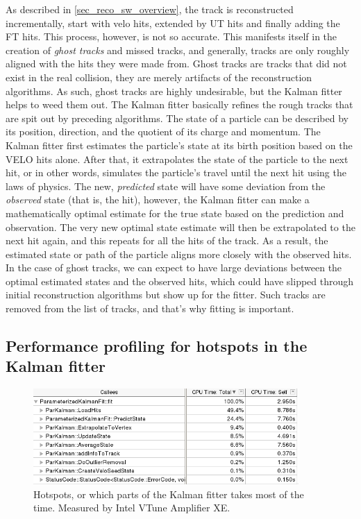 \documentclass[12pt]{article}
\begin{document}
As described in \ref{sec_reco_sw_overview}, the track is reconstructed incrementally, start with velo hits, extended by UT hits and finally adding the FT hits. This process, however, is not so accurate. This manifests itself in the creation of \textit{ghost tracks} and missed tracks, and generally, tracks are only roughly aligned with the hits they were made from. Ghost tracks are tracks that did not exist in the real collision, they are merely artifacts of the reconstruction algorithms. As such, ghost tracks are highly undesirable, but the Kalman fitter helps to weed them out. 
The Kalman fitter basically refines the rough tracks that are spit out by preceding algorithms. The state of a particle can be described by its position, direction, and the quotient of its charge and momentum. The Kalman fitter first estimates the particle's state at its birth position based on the VELO hits alone. After that, it extrapolates the state of the particle to the next hit, or in other words, simulates the particle's travel until the next hit using the laws of physics. The new, \textit{predicted} state will have some deviation from the \textit{observed} state (that is, the hit), however, the Kalman fitter can make a mathematically optimal estimate for the true state based on the prediction and observation. The very new optimal state estimate will then be extrapolated to the next hit again, and this repeats for all the hits of the track.
As a result, the estimated state or path of the particle aligns more closely with the observed hits. In the case of ghost tracks, we can expect to have large deviations between the optimal estimated states and the observed hits, which could have slipped through initial reconstruction algorithms but show up for the fitter. Such tracks are removed from the list of tracks, and that's why fitting is important.


\subsection{Performance profiling for hotspots in the Kalman fitter}

\begin{figure}[H]
	\begin{center}
		\includegraphics[width=0.9\textwidth]{kalmanfit_overall_breakdown}
	\end{center}
	\caption{Hotspots, or which parts of the Kalman fitter takes most of the time. Measured by Intel VTune Amplifier XE.}
	\label{fig_kalman_vtune_initial}
\end{figure}
\end{document}
